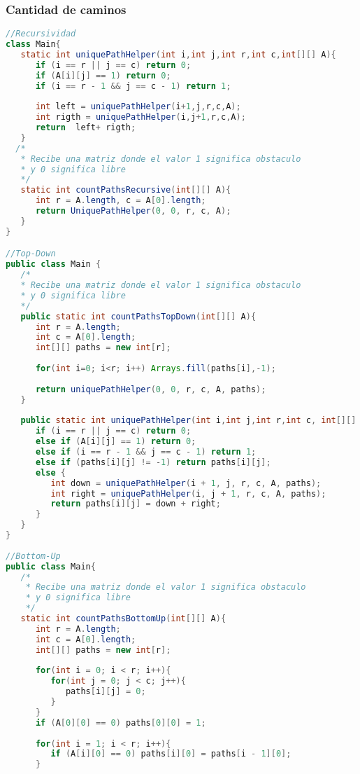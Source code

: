 \subsubsection{Cantidad de caminos}
\begin{lstlisting}[language=Java]
//Recursividad
class Main{
   static int uniquePathHelper(int i,int j,int r,int c,int[][] A){
      if (i == r || j == c) return 0;
      if (A[i][j] == 1) return 0;
      if (i == r - 1 && j == c - 1) return 1;
      
      int left = uniquePathHelper(i+1,j,r,c,A);
      int rigth = uniquePathHelper(i,j+1,r,c,A); 	
      return  left+ rigth;
   }
  /*
   * Recibe una matriz donde el valor 1 significa obstaculo
   * y 0 significa libre
   */
   static int countPathsRecursive(int[][] A){
      int r = A.length, c = A[0].length;
      return UniquePathHelper(0, 0, r, c, A);
   }
}

//Top-Down
public class Main {
   /*
   * Recibe una matriz donde el valor 1 significa obstaculo
   * y 0 significa libre
   */
   public static int countPathsTopDown(int[][] A){
      int r = A.length;
      int c = A[0].length;
      int[][] paths = new int[r];
		
      for(int i=0; i<r; i++) Arrays.fill(paths[i],-1);
      
      return uniquePathHelper(0, 0, r, c, A, paths);
   }
	
   public static int uniquePathHelper(int i,int j,int r,int c, int[][] A,int[][] paths){
      if (i == r || j == c) return 0;
      else if (A[i][j] == 1) return 0;
	  else if (i == r - 1 && j == c - 1) return 1;
      else if (paths[i][j] != -1) return paths[i][j];
      else {
         int down = uniquePathHelper(i + 1, j, r, c, A, paths);
         int right = uniquePathHelper(i, j + 1, r, c, A, paths);
         return paths[i][j] = down + right;
      }
   }
}
		
//Bottom-Up
public class Main{
   /*
    * Recibe una matriz donde el valor 1 significa obstaculo
    * y 0 significa libre
    */
   static int countPathsBottomUp(int[][] A){
      int r = A.length;
      int c = A[0].length;
      int[][] paths = new int[r];
      
      for(int i = 0; i < r; i++){
         for(int j = 0; j < c; j++){
            paths[i][j] = 0;
         }
      }
      if (A[0][0] == 0) paths[0][0] = 1;
		
      for(int i = 1; i < r; i++){
         if (A[i][0] == 0) paths[i][0] = paths[i - 1][0];
      }
		

\end{lstlisting}
